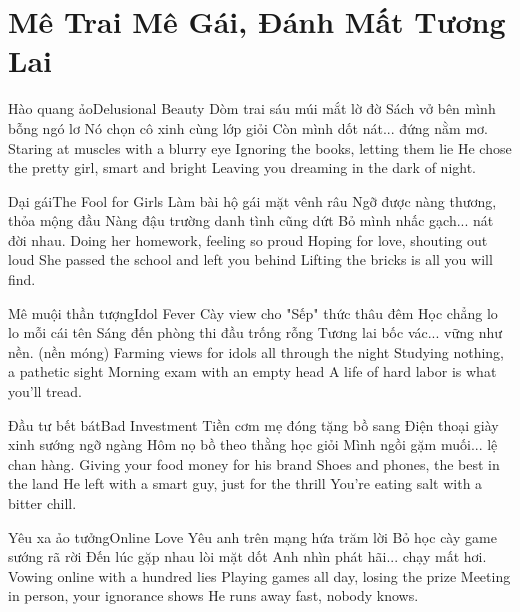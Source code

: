 \chapter{Mê Trai Mê Gái, Đánh Mất Tương Lai}

\begin{tutuyetbox}{Hào quang ảo}{Delusional Beauty}
Dòm trai sáu múi mắt lờ đờ
Sách vở bên mình bỗng ngó lơ
Nó chọn cô xinh cùng lớp giỏi
Còn mình dốt nát... đứng nằm mơ.
\tcblower
Staring at muscles with a blurry eye
Ignoring the books, letting them lie
He chose the pretty girl, smart and bright
Leaving you dreaming in the dark of night.
\end{tutuyetbox}

\begin{tutuyetbox}{Dại gái}{The Fool for Girls}
Làm bài hộ gái mặt vênh râu
Ngỡ được nàng thương, thỏa mộng đầu
Nàng đậu trường danh tình cũng dứt
Bỏ mình nhấc gạch... nát đời nhau.
\tcblower
Doing her homework, feeling so proud
Hoping for love, shouting out loud
She passed the school and left you behind
Lifting the bricks is all you will find.
\end{tutuyetbox}

\begin{tutuyetbox}{Mê muội thần tượng}{Idol Fever}
Cày view cho "Sếp" thức thâu đêm
Học chẳng lo lo mỗi cái tên
Sáng đến phòng thi đầu trống rỗng
Tương lai bốc vác... vững như nền. (nền móng)
\tcblower
Farming views for idols all through the night
Studying nothing, a pathetic sight
Morning exam with an empty head
A life of hard labor is what you'll tread.
\end{tutuyetbox}

\begin{tutuyetbox}{Đầu tư bết bát}{Bad Investment}
Tiền cơm mẹ đóng tặng bồ sang
Điện thoại giày xinh sướng ngỡ ngàng
Hôm nọ bồ theo thằng học giỏi
Mình ngồi gặm muối... lệ chan hàng.
\tcblower
Giving your food money for his brand
Shoes and phones, the best in the land
He left with a smart guy, just for the thrill
You're eating salt with a bitter chill.
\end{tutuyetbox}

\begin{tutuyetbox}{Yêu xa ảo tưởng}{Online Love}
Yêu anh trên mạng hứa trăm lời
Bỏ học cày game sướng rã rời
Đến lúc gặp nhau lòi mặt dốt
Anh nhìn phát hãi... chạy mất hơi.
\tcblower
Vowing online with a hundred lies
Playing games all day, losing the prize
Meeting in person, your ignorance shows
He runs away fast, nobody knows.
\end{tutuyetbox}

